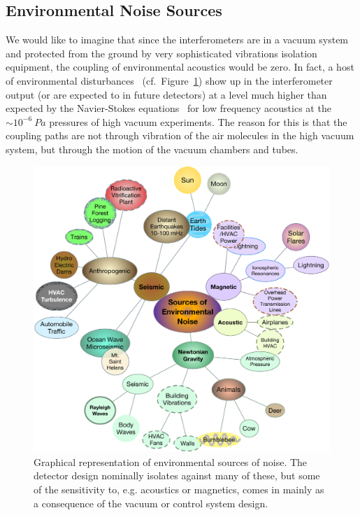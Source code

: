 \subsection{Environmental Noise Sources}
We would like to imagine that since the interferometers are in a vacuum system and
protected from the ground by very sophisticated vibrations isolation equipment,
the coupling of environmental acoustics would be zero. In fact, a host of environmental
disturbances~\cite{Effler:2015hw, Acernese:2006dq} (cf.~Figure~\ref{fig:EnvironmentalNoise}) show up in the interferometer
output (or are expected to in future detectors) at a level much higher than
expected by the Navier-Stokes equations~\cite{Greenspan:sound} for low frequency
acoustics at the $\sim10^{-6}~Pa$ pressures of high vacuum experiments. The reason
for this is that the coupling paths are not through vibration of the air molecules
in the high vacuum system, but through the motion of the vacuum chambers and tubes.




\begin{figure}[t]
\centering
\includegraphics[width=\columnwidth]{Figures/Environmental.pdf}
\caption{Graphical representation of environmental sources of noise. The detector
design nominally isolates against many of these, but some of the sensitivity to,
e.g. acoustics or magnetics, comes in mainly as a consequence of the vacuum
or control system design.}
\label{fig:EnvironmentalNoise}
\end{figure}


